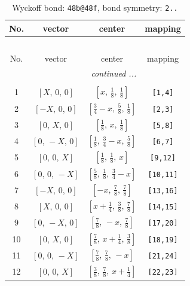 \documentclass[fleqn,8pt]{jsarticle}
\begin{document}
\renewcommand{\arraystretch}{1.2}
\begin{longtable}{cccc}
\caption{Wyckoff bond: {\tt 48b@48f}, bond symmetry: {\tt 2..}}
 \\
 \hline \hline
No. & vector & center & mapping \\ \hline \endfirsthead

\multicolumn{3}{l}{\tablename\ \thetable{}} \\
 \hline \hline
No. & vector & center & mapping \\ \hline \endhead

 \hline \hline
\multicolumn{3}{r}{\footnotesize\it continued ...} \\ \endfoot

 \hline \hline
\multicolumn{3}{r}{} \\ \endlastfoot

1 & $\left[ X,\, 0,\, 0 \right]$ & $\left[ x,\, \frac{1}{8},\, \frac{1}{8} \right]$ & {\tt [1,4]} \\ \hline
2 & $\left[ - X,\, 0,\, 0 \right]$ & $\left[ \frac{3}{4} - x,\, \frac{5}{8},\, \frac{1}{8} \right]$ & {\tt [2,3]} \\ \hline
3 & $\left[ 0,\, X,\, 0 \right]$ & $\left[ \frac{1}{8},\, x,\, \frac{1}{8} \right]$ & {\tt [5,8]} \\ \hline
4 & $\left[ 0,\, - X,\, 0 \right]$ & $\left[ \frac{1}{8},\, \frac{3}{4} - x,\, \frac{5}{8} \right]$ & {\tt [6,7]} \\ \hline
5 & $\left[ 0,\, 0,\, X \right]$ & $\left[ \frac{1}{8},\, \frac{1}{8},\, x \right]$ & {\tt [9,12]} \\ \hline
6 & $\left[ 0,\, 0,\, - X \right]$ & $\left[ \frac{5}{8},\, \frac{1}{8},\, \frac{3}{4} - x \right]$ & {\tt [10,11]} \\ \hline
7 & $\left[ - X,\, 0,\, 0 \right]$ & $\left[ - x,\, \frac{7}{8},\, \frac{7}{8} \right]$ & {\tt [13,16]} \\ \hline
8 & $\left[ X,\, 0,\, 0 \right]$ & $\left[ x + \frac{1}{4},\, \frac{3}{8},\, \frac{7}{8} \right]$ & {\tt [14,15]} \\ \hline
9 & $\left[ 0,\, - X,\, 0 \right]$ & $\left[ \frac{7}{8},\, - x,\, \frac{7}{8} \right]$ & {\tt [17,20]} \\ \hline
10 & $\left[ 0,\, X,\, 0 \right]$ & $\left[ \frac{7}{8},\, x + \frac{1}{4},\, \frac{3}{8} \right]$ & {\tt [18,19]} \\ \hline
11 & $\left[ 0,\, 0,\, - X \right]$ & $\left[ \frac{7}{8},\, \frac{7}{8},\, - x \right]$ & {\tt [21,24]} \\ \hline
12 & $\left[ 0,\, 0,\, X \right]$ & $\left[ \frac{3}{8},\, \frac{7}{8},\, x + \frac{1}{4} \right]$ & {\tt [22,23]} \\
\end{longtable}
\end{document}
